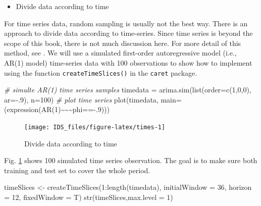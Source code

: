 \documentclass[
  12pt,
]{krantz}
\makeatletter
\newenvironment{Shaded}{\begin{snugshade}}{\end{snugshade}}
\newcommand{\AttributeTok}[1]{\textcolor[rgb]{0.61,0.61,0.61}{#1}}
\newcommand{\CommentTok}[1]{\textcolor[rgb]{0.37,0.37,0.37}{\textit{#1}}}
\newcommand{\DecValTok}[1]{\textcolor[rgb]{0.06,0.06,0.06}{#1}}
\newcommand{\ErrorTok}[1]{\textcolor[rgb]{0.14,0.14,0.14}{\textbf{#1}}}
\newcommand{\FunctionTok}[1]{\textcolor[rgb]{0,0,0}{#1}}
\newcommand{\NormalTok}[1]{#1}
\newcommand{\OtherTok}[1]{\textcolor[rgb]{0.37,0.37,0.37}{#1}}
\newcommand{\SpecialCharTok}[1]{\textcolor[rgb]{0,0,0}{#1}}
\providecommand{\tightlist}{%
  \setlength{\itemsep}{0pt}\setlength{\parskip}{0pt}}
\newenvironment{kframe}{%
\medskip{}
\setlength{\fboxsep}{.8em}
 \def\at@end@of@kframe{}%
 \ifinner\ifhmode%
  \def\at@end@of@kframe{\end{minipage}}%
  \begin{minipage}{\columnwidth}%
 \fi\fi%
 \def\FrameCommand##1{\hskip\@totalleftmargin \hskip-\fboxsep
 \colorbox{shadecolor}{##1}\hskip-\fboxsep
     \hskip-\linewidth \hskip-\@totalleftmargin \hskip\columnwidth}%
 \MakeFramed {\advance\hsize-\width
   \@totalleftmargin\z@ \linewidth\hsize
   \@setminipage}}%
 {\par\unskip\endMakeFramed%
 \at@end@of@kframe}
\renewenvironment{Shaded}{\begin{kframe}}{\end{kframe}}
\makeatother
\begin{document}
\begin{itemize}
\tightlist
\item
  Divide data according to time
\end{itemize}

For time series data, random sampling is usually not the best way. There is an approach to divide data according to time-series. Since time series is beyond the scope of this book, there is not much discussion here. For more detail of this method, see \citep{Hyndman}. We will use a simulated first-order autoregressive model (i.e., AR(1) model) time-series data with 100 observations to show how to implement using the function \texttt{createTimeSlices()} in the \texttt{caret} package.

\begin{Shaded}
\begin{Highlighting}[]
\CommentTok{\# simulte AR(1) time series samples}
\NormalTok{timedata }\OtherTok{=} \FunctionTok{arima.sim}\NormalTok{(}\FunctionTok{list}\NormalTok{(}\AttributeTok{order=}\FunctionTok{c}\NormalTok{(}\DecValTok{1}\NormalTok{,}\DecValTok{0}\NormalTok{,}\DecValTok{0}\NormalTok{), }\AttributeTok{ar=}\SpecialCharTok{{-}}\NormalTok{.}\DecValTok{9}\NormalTok{), }\AttributeTok{n=}\DecValTok{100}\NormalTok{)}
\CommentTok{\# plot time series}
\FunctionTok{plot}\NormalTok{(timedata, }\AttributeTok{main=}\NormalTok{(}\FunctionTok{expression}\NormalTok{(}\FunctionTok{AR}\NormalTok{(}\DecValTok{1}\NormalTok{)}\SpecialCharTok{\textasciitilde{}}\ErrorTok{\textasciitilde{}\textasciitilde{}}\NormalTok{phi}\SpecialCharTok{=={-}}\NormalTok{.}\DecValTok{9}\NormalTok{)))     }
\end{Highlighting}
\end{Shaded}

\begin{figure}

{\centering \texttt{[image: IDS\_files/figure-latex/times-1]} 

}

\caption{Divide data according to time}\label{fig:times}
\end{figure}

Fig. \ref{fig:times} shows 100 simulated time series observation. The goal is to make sure both training and test set to cover the whole period.

\begin{Shaded}
\begin{Highlighting}[]
\NormalTok{timeSlices }\OtherTok{\textless{}{-}} \FunctionTok{createTimeSlices}\NormalTok{(}\DecValTok{1}\SpecialCharTok{:}\FunctionTok{length}\NormalTok{(timedata), }
                   \AttributeTok{initialWindow =} \DecValTok{36}\NormalTok{, }
                   \AttributeTok{horizon =} \DecValTok{12}\NormalTok{, }
                   \AttributeTok{fixedWindow =}\NormalTok{ T)}
\FunctionTok{str}\NormalTok{(timeSlices,}\AttributeTok{max.level =} \DecValTok{1}\NormalTok{)}
\end{Highlighting}
\end{Shaded}
\end{document}
